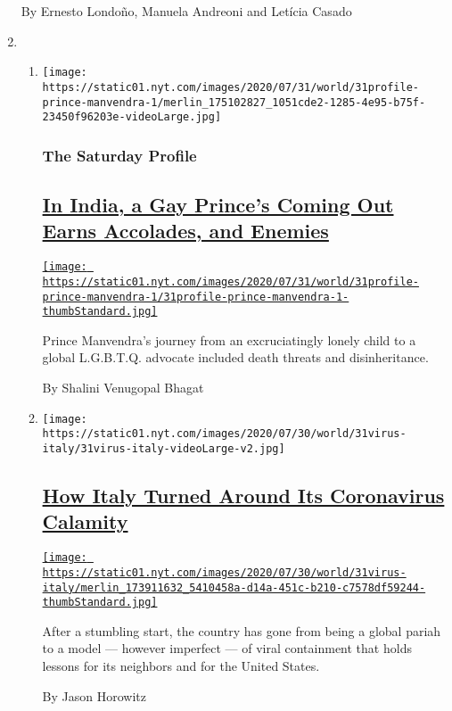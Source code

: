 \begin{enumerate}
  By Ernesto Londoño, Manuela Andreoni and Letícia Casado
\item
  \begin{enumerate}
  \def\labelenumii{\arabic{enumii}.}
  \item
    \texttt{[image: https://static01.nyt.com/images/2020/07/31/world/31profile-prince-manvendra-1/merlin\_175102827\_1051cde2-1285-4e95-b75f-23450f96203e-videoLarge.jpg]}

    \hypertarget{the-saturday-profile}{%
    \subsubsection{The Saturday Profile}\label{the-saturday-profile}}

    \hypertarget{in-india-a-gay-princes-coming-out-earns-accolades-and-enemies}{%
    \subsection{\texorpdfstring{\href{/2020/07/31/world/asia/india-prince-manvendra-gay-rights.html}{In
    India, a Gay Prince's Coming Out Earns Accolades, and
    Enemies}}{In India, a Gay Prince's Coming Out Earns Accolades, and Enemies}}\label{in-india-a-gay-princes-coming-out-earns-accolades-and-enemies}}

    \href{/2020/07/31/world/asia/india-prince-manvendra-gay-rights.html}{\texttt{[image: https://static01.nyt.com/images/2020/07/31/world/31profile-prince-manvendra-1/31profile-prince-manvendra-1-thumbStandard.jpg]}}

    Prince Manvendra's journey from an excruciatingly lonely child to a
    global L.G.B.T.Q. advocate included death threats and
    disinheritance.

    By Shalini Venugopal Bhagat
  \item
    \texttt{[image: https://static01.nyt.com/images/2020/07/30/world/31virus-italy/31virus-italy-videoLarge-v2.jpg]}

    \hypertarget{how-italy-turned-around-its-coronavirus-calamity}{%
    \subsection{\texorpdfstring{\href{/2020/07/31/world/europe/italy-coronavirus-reopening.html}{How
    Italy Turned Around Its Coronavirus
    Calamity}}{How Italy Turned Around Its Coronavirus Calamity}}\label{how-italy-turned-around-its-coronavirus-calamity}}

    \href{/2020/07/31/world/europe/italy-coronavirus-reopening.html}{\texttt{[image: https://static01.nyt.com/images/2020/07/30/world/31virus-italy/merlin\_173911632\_5410458a-d14a-451c-b210-c7578df59244-thumbStandard.jpg]}}

    After a stumbling start, the country has gone from being a global
    pariah to a model --- however imperfect --- of viral containment
    that holds lessons for its neighbors and for the United States.

    By Jason Horowitz
  \end{enumerate}
\end{enumerate}

